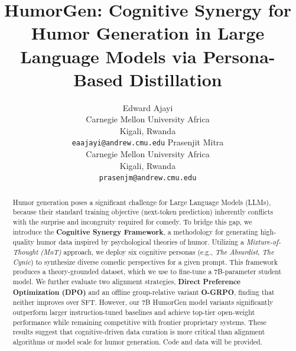 \documentclass[11pt]{article}
\title{HumorGen: Cognitive Synergy for Humor Generation in Large Language Models via Persona-Based Distillation}
\author{
Edward Ajayi \\
Carnegie Mellon University Africa \\
Kigali, Rwanda \\
\texttt{eaajayi@andrew.cmu.edu}
\And
Prasenjit Mitra \\
Carnegie Mellon University Africa \\
Kigali, Rwanda \\
\texttt{prasenjm@andrew.cmu.edu}
}
\begin{document}
\maketitle



\begin{abstract}
Humor generation poses a significant challenge for Large Language Models (LLMs), because their standard training objective (next-token prediction) inherently conflicts with the surprise and incongruity required for comedy. To bridge this gap, we introduce the \textbf{Cognitive Synergy Framework}, a methodology for generating high-quality humor data inspired by psychological theories of humor. Utilizing a \textit{Mixture-of-Thought (MoT)} approach, we deploy six cognitive personas (e.g., \textit{The Absurdist}, \textit{The Cynic}) to synthesize diverse comedic perspectives for a given prompt. This framework produces a theory-grounded dataset, which we use to fine-tune a 7B-parameter student model. We further evaluate two alignment strategies, \textbf{Direct Preference Optimization (DPO)} and an offline group-relative variant \textbf{O-GRPO}, finding that neither improves over SFT. However, our 7B HumorGen model variants significantly outperform larger instruction-tuned baselines and achieve top-tier open-weight performance while remaining competitive with frontier proprietary systems. These results suggest that cognitive-driven data curation is more critical than alignment algorithms or model scale for humor generation. Code and data will be provided.
\end{abstract}
\end{document}
